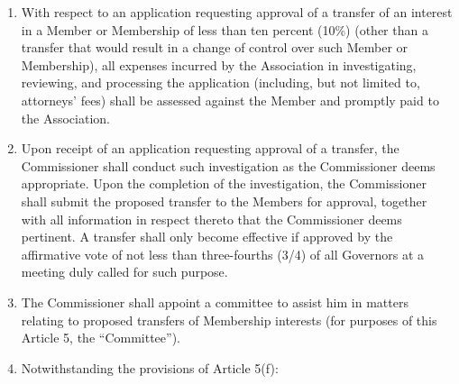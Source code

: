 \documentclass[]{book}
\begin{document}
\begin{enumerate}
\item
  With respect to an application requesting approval of a transfer of an interest in a Member or Membership of less than ten percent (10\%) (other than a transfer that would result in a change of control over such Member or Membership), all expenses incurred by the Association in investigating, reviewing, and processing the application (including, but not limited to, attorneys' fees) shall be assessed against the Member and promptly paid to the Association.
\item
  Upon receipt of an application requesting approval of a transfer, the Commissioner shall conduct such investigation as the Commissioner deems appropriate. Upon the completion of the investigation, the Commissioner shall submit the proposed transfer to the Members for approval, together with all information in respect thereto that the Commissioner deems pertinent. A transfer shall only become effective if approved by the affirmative vote of not less than three-fourths (3/4) of all Governors at a meeting duly called for such purpose.
\item
  The Commissioner shall appoint a committee to assist him in matters relating to proposed transfers of Membership interests (for purposes of this Article 5, the ``Committee'').
\item
  Notwithstanding the provisions of Article 5(f):


\end{enumerate}
\end{document}
